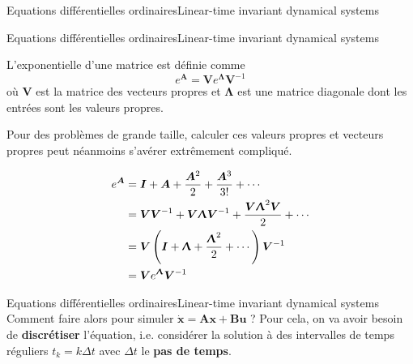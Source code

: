 \documentclass[usenames,dvipsnames,svgnames,10pt,aspectratio=169]{beamer}
\begin{document}
\begin{frame}[t, c]{Equations différentielles ordinaires}{Linear-time invariant dynamical systems}
\begin{minipage}{.48\textwidth}
  \end{minipage}
\end{frame}

\begin{frame}[t, c]{Equations différentielles ordinaires}{Linear-time invariant dynamical systems}
  \begin{minipage}{.58\textwidth}
    L'exponentielle d'une matrice est définie comme
    \[
    e^{\bm{A}} = \bm{V} e^{\boldsymbol{\Lambda}} \bm{V}^{-1}
    \]
    où $\bm{V}$ est la matrice des vecteurs propres et $\boldsymbol{\Lambda}$ est une matrice diagonale dont les entrées sont les valeurs propres.

    \bigskip

    Pour des problèmes de grande taille, calculer ces valeurs propres et vecteurs propres peut néanmoins s'avérer extrêmement compliqué.
  \end{minipage}%
  \hfill
  \begin{minipage}{.38\textwidth}
    \[
    \begin{aligned}
      e^{\bm{A}} & = \bm{I} + \bm{A} + \dfrac{\bm{A}^2}{2} + \dfrac{\bm{A}^3}{3!} + \cdots \\
      & = \bm{VV}^{-1} + \bm{V} \boldsymbol{\Uplambda} \bm{V}^{-1} + \dfrac{\bm{V} \boldsymbol{\Uplambda}^2 \bm{V}}{2} + \cdots \\
      & = \bm{V} \left( \bm{I} + \boldsymbol{\Uplambda} + \dfrac{\boldsymbol{\Uplambda}^2}{2} + \cdots \right) \bm{V}^{-1} \\
      & = \bm{V} e^{\boldsymbol{\Uplambda}} \bm{V}^{-1}
    \end{aligned}
    \]
  \end{minipage}
\end{frame}

\begin{frame}[t, c]{Equations différentielles ordinaires}{Linear-time invariant dynamical systems}
  Comment faire alors pour simuler \( \dot{\bm{x}} = \bm{Ax} + \bm{Bu} \) ?
  Pour cela, on va avoir besoin de \alert{\textbf{discrétiser}} l'équation, i.e. considérer la solution à des intervalles de temps réguliers $t_k = k \Delta t$ avec $\Delta t$ le \alert{\textbf{pas de temps}}.
\end{frame}
\end{document}
